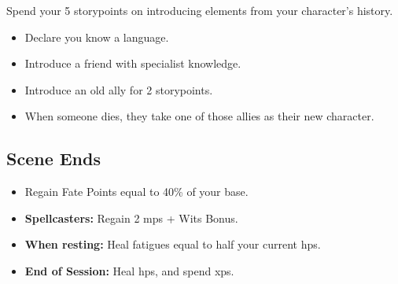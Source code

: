 \begin{multicols}{2}
Spend your 5 \glspl{storypoint} on introducing elements from your character's history.

\begin{itemize}

  \item
  Declare you know a language.
  \item
  Introduce a friend with specialist knowledge.
  \item
  Introduce an old ally for 2 \glspl{storypoint}.
  \item
  When someone dies, they take one of those allies as their new character.

\end{itemize}

\subsection{Scene Ends}

\begin{itemize}

  \item
  Regain Fate Points equal to 40\% of your base.
  \item
  \textbf{Spellcasters:} Regain 2 \glspl{mp} + Wits Bonus.
  \item
  \textbf{When resting:} Heal \glspl{fatigue} equal to half your current \glspl{hp}.
  \item
  \textbf{End of Session:} Heal \glspl{hp}, and spend \glspl{xp}.

\end{itemize}

\end{multicols}
